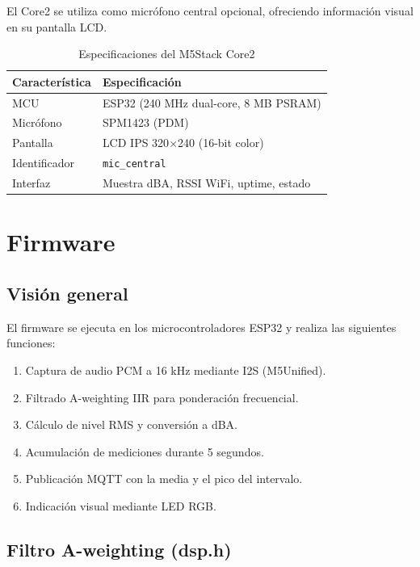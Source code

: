 \documentclass[12pt,a4paper]{report}
\begin{document}
El Core2 se utiliza como micr\'ofono central opcional, ofreciendo informaci\'on visual en su pantalla LCD.

\begin{table}[H]
\centering
\begin{tabularx}{\textwidth}{lX}
\toprule
\textbf{Caracter\'istica} & \textbf{Especificaci\'on} \\
\midrule
MCU & ESP32 (240 MHz dual-core, 8 MB PSRAM) \\
Micr\'ofono & SPM1423 (PDM) \\
Pantalla & LCD IPS 320$\times$240 (16-bit color) \\
Identificador & \texttt{mic\_central} \\
Interfaz & Muestra dBA, RSSI WiFi, uptime, estado \\
\bottomrule
\end{tabularx}
\caption{Especificaciones del M5Stack Core2}
\end{table}

\chapter{Firmware}

\section{Visi\'on general}

El firmware se ejecuta en los microcontroladores ESP32 y realiza las siguientes funciones:

\begin{enumerate}
    \item Captura de audio PCM a 16 kHz mediante I2S (M5Unified).
    \item Filtrado A-weighting IIR para ponderaci\'on frecuencial.
    \item C\'alculo de nivel RMS y conversi\'on a dBA.
    \item Acumulaci\'on de mediciones durante 5 segundos.
    \item Publicaci\'on MQTT con la media y el pico del intervalo.
    \item Indicaci\'on visual mediante LED RGB.
\end{enumerate}

\section{Filtro A-weighting (dsp.h)}
\end{document}
